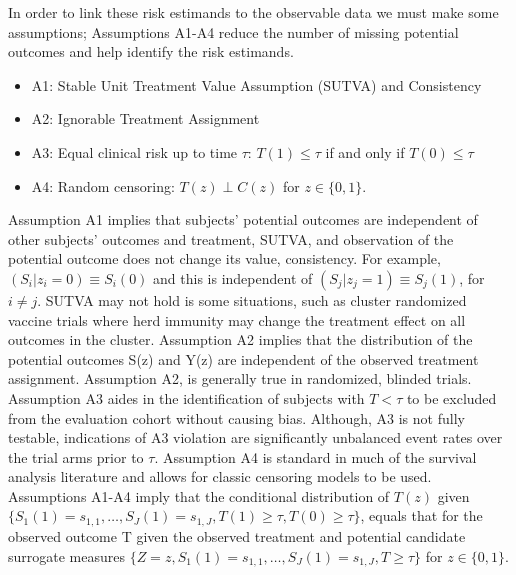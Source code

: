 \documentclass[times, doublespace]{simauth}
\begin{document}
In order to link these risk estimands to the observable data we must make some assumptions; Assumptions A1-A4 reduce the number of missing potential outcomes and help identify the risk estimands.
\begin{itemize}
\item A1: Stable Unit Treatment Value Assumption (SUTVA) and Consistency 
\item A2: Ignorable Treatment Assignment
\item A3: Equal clinical risk up to time $\tau$: $T(1) \leq\tau$ if and only if $T(0) \leq\tau$
\item A4: Random censoring: $T(z) \perp C(z)$ for $z\in \{0,1\}$.
\end{itemize} 
Assumption A1 implies that subjects' potential outcomes are independent of other subjects' outcomes and treatment, SUTVA, and observation of the potential outcome does not change its value, consistency. For example, $(S_i|z_i=0) \equiv S_i(0)$ and this is independent of $(S_j|z_j=1) \equiv S_j(1)$, for $i \neq j$. SUTVA may not hold is some situations, such as cluster randomized vaccine trials where herd immunity may change the treatment effect on all outcomes in the cluster.  Assumption A2 implies that the distribution of the potential outcomes S(z) and Y(z) are independent of the observed treatment assignment. Assumption A2, is generally true in randomized, blinded trials.  Assumption A3 aides in the identification of subjects with $T < \tau$ to be excluded from the evaluation cohort without causing bias. Although, A3 is not fully testable, indications of A3 violation are significantly unbalanced event rates over the trial arms prior to $\tau$. Assumption A4 is standard in much of the survival analysis literature and allows for classic censoring models to be used. Assumptions A1-A4 imply that the conditional distribution of $T(z)$ given $\{S_{1}(1)=s_{1,1},\ldots,S_{J}(1)=s_{1,J}, T(1)\geq\tau, T(0)\geq\tau\}$, equals that for the observed outcome T given the observed treatment and potential candidate surrogate measures $\{Z=z, S_{1}(1)=s_{1,1},\ldots,S_{J}(1)=s_{1,J},T\geq\tau\}$ for $z\in \{0,1\}$.
\end{document}
